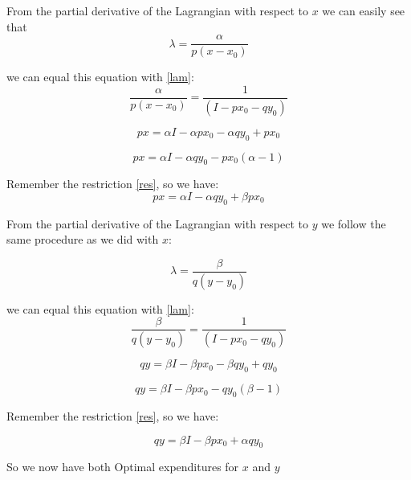 \documentclass{article}
\begin{document}
From the partial derivative of the Lagrangian with respect to $x$ we can easily see that
\begin{equation}
  \lambda = \frac{\alpha}{p(x - x_0)}
\end{equation}

we can equal this equation with \ref{lam}:
\begin{equation}
  \frac{\alpha}{p(x - x_0)} = \frac{1}{(I - px_0 - qy_0)}
\end{equation}


\begin{equation}
  px = \alpha I - \alpha px_0 - \alpha q y_0 + px_0
\end{equation}

\begin{equation}
  px = \alpha I - \alpha q y_0 - px_0(\alpha - 1)
\end{equation}

Remember the restriction \ref{res}, so we have:
\begin{equation}
  px = \alpha I - \alpha q y_0 + \beta px_0
\end{equation}

From the partial derivative of the Lagrangian with respect to $y$ we follow the same procedure as we did with $x$:

\begin{equation}
  \lambda = \frac{\beta}{q(y - y_0)}
\end{equation}

we can equal this equation with \ref{lam}:
\begin{equation}
   \frac{\beta}{q(y - y_0)} = \frac{1}{(I - px_0 - qy_0)}
\end{equation}

\begin{equation}
  qy = \beta I - \beta px_0 - \beta q y_0 + qy_0
\end{equation}

\begin{equation}
  qy = \beta I - \beta px_0 - qy_0(\beta - 1)
\end{equation}

Remember the restriction \ref{res}, so we have:

\begin{equation}
  qy = \beta I - \beta px_0 + \alpha qy_0
\end{equation}

So we now have both Optimal expenditures for $x$ and $y$
\end{document}
